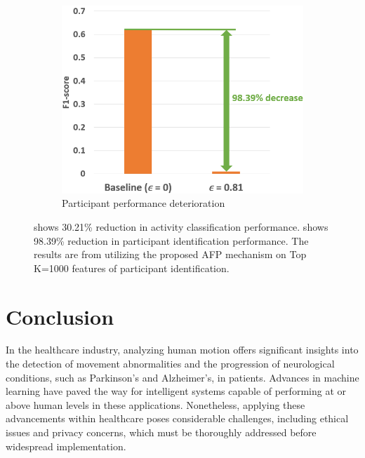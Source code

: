 \documentclass{l4proj}
\begin{document}
\begin{figure}[h]
\begin{subfigure}{0.35\textwidth}
    \includegraphics[width=\textwidth]{images/privacy-preservation-difference-comparison-method2-participant-f1-scores.png}
    \caption{Participant performance deterioration}
    \label{fig:privacy-preservation-difference-comparison-method2-participant-f1-scores}
    \end{subfigure}
    \caption{ shows 30.21\% reduction in activity classification performance.  shows 98.39\% reduction in participant identification performance. The results are from utilizing the proposed AFP mechanism on Top K=1000 features of participant identification.}
    \label{fig:privacy-preservation-evaluation-and-difference-comparison}
\end{figure}


\chapter{Conclusion}

In the healthcare industry, analyzing human motion offers significant insights into the detection of movement abnormalities and the progression of neurological conditions, such as Parkinson's and Alzheimer's, in patients. Advances in machine learning have paved the way for intelligent systems capable of performing at or above human levels in these applications. Nonetheless, applying these advancements within healthcare poses considerable challenges, including ethical issues and privacy concerns, which must be thoroughly addressed before widespread implementation.
\end{document}
